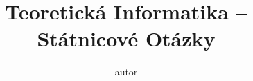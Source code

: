 \documentclass{article}
\author{autor}
\theoremstyle{plain}
\theoremstyle{definition}
\begin{document}
\title{Teoretická Informatika -- Státnicové Otázky}

\maketitle
\tableofcontents
\thispagestyle{empty} %
\clearpage %
\setcounter{page}{1} %

 
 
 
 
 
 
 
 
\end{document}
